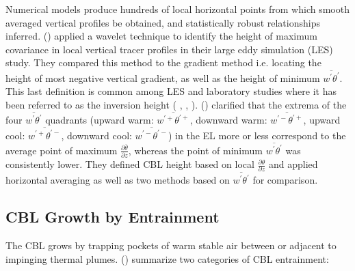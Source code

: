 Numerical models produce hundreds of local horizontal points from which smooth averaged vertical profiles be obtained, and statistically robust relationships inferred. \citeauthor{BrooksFowler2} (\citeyear{BrooksFowler2}) applied a wavelet technique to identify the height of maximum covariance in local vertical tracer profiles in their large eddy simulation (\acs{LES}) study.  They compared this method to the gradient method i.e. locating the height of most negative vertical gradient, as well as the height of minimum $\overline{w^{'}\theta^{'}}$.  This last definition is common among \acs{LES} and laboratory studies where it has been referred to as the inversion height (\citeauthor{DearWill80} \citeyear{DearWill80}, \citeauthor{Sorbjan1} \citeyear{Sorbjan1}, \citeauthor{FedConzMir04} \citeyear{FedConzMir04}).  \citeauthor{SullMoengStev} (\citeyear{SullMoengStev}) clarified that the extrema of the four $\overline{w^{'}\theta^{'}}$ quadrants (upward warm: $\overline{w^{'+}\theta^{'+}}$, downward warm: $\overline{w^{'-}\theta^{'+}}$, upward cool: $\overline{w^{'+}\theta^{'-}}$, downward cool: $\overline{w^{'-}\theta^{'-}}$) in the \acs{EL} more or less correspond to the average point of maximum $\frac{\partial \overline{\theta}}{\partial z}$, whereas the point of minimum $\overline{w^{'}\theta^{'}}$ was consistently lower. They defined \acs{CBL} height based on local $\frac{\partial \theta}{\partial z}$ and applied horizontal averaging as well as two methods based on $\overline{w^{'}\theta^{'}}$
for comparison.\\


\subsection{CBL Growth by Entrainment}
\label{subsec:}

The \acs{CBL} grows by trapping pockets of warm stable air between
or adjacent to impinging thermal plumes.  \citeauthor{Traum11} (\citeyear{Traum11}) summarize two categories of \acs{CBL} entrainment:\\

